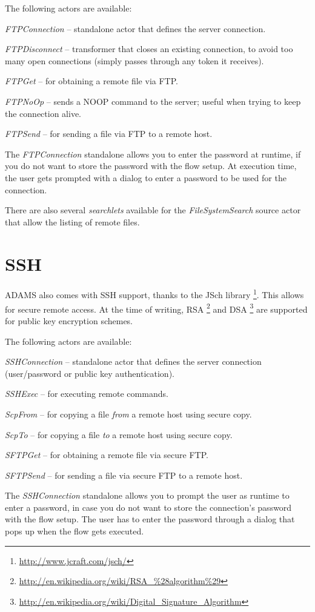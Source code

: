 \documentclass[a4paper]{book}
\begin{document}
The following actors are available:
\begin{tight_itemize}
	\item \textit{FTPConnection} -- standalone actor that defines the server
	connection.
	\item \textit{FTPDisconnect} -- transformer that closes an existing 
	connection, to avoid too many open connections (simply passes through any 
	token it receives).
	\item \textit{FTPGet} -- for obtaining a remote file via FTP.
	\item \textit{FTPNoOp} -- sends a NOOP command to the server; useful when
	trying to keep the connection alive.
	\item \textit{FTPSend} -- for sending a file via FTP to a remote host.
\end{tight_itemize}
The \textit{FTPConnection} standalone allows you to enter the password at 
runtime, if you do not want to store the password with the
flow setup. At execution time, the user gets prompted with a dialog to enter
a password to be used for the connection.

There are also several \textit{searchlets} available for the
\textit{FileSystemSearch} source actor that allow the listing of remote
files.


\chapter{SSH}
ADAMS also comes with SSH support, thanks to the JSch library
\footnote{\url{http://www.jcraft.com/jsch/}{}}. This allows for secure remote
access. At the time of writing, RSA
\footnote{\url{http://en.wikipedia.org/wiki/RSA_\%28algorithm\%29}{}} and DSA
\footnote{\url{http://en.wikipedia.org/wiki/Digital_Signature_Algorithm}{}} are
supported for public key encryption schemes.

The following actors are available:
\begin{tight_itemize}
	\item \textit{SSHConnection} -- standalone actor that defines the server
	connection (user/password or public key authentication).
	\item \textit{SSHExec} -- for executing remote commands.
	\item \textit{ScpFrom} -- for copying a file \textit{from} a remote host using
	secure copy.
	\item \textit{ScpTo} -- for copying a file \textit{to} a remote host using
	secure copy.
	\item \textit{SFTPGet} -- for obtaining a remote file via secure FTP.
	\item \textit{SFTPSend} -- for sending a file via secure FTP to a remote host.
\end{tight_itemize}
The \textit{SSHConnection} standalone allows you to prompt the user as runtime
to enter a password, in case you do not want to store the connection's password
with the flow setup. The user has to enter the password through a dialog that
pops up when the flow gets executed.
\end{document}
